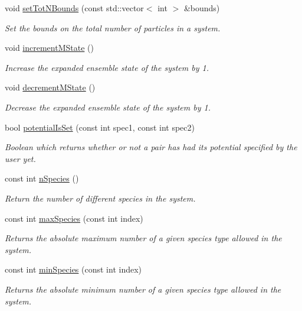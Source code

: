 \begin{DoxyCompactItemize}
void \hyperlink{classsim_system_a76b5dc3e179e275e40726c660d8e669b}{set\-Tot\-N\-Bounds} (const std\-::vector$<$ int $>$ \&bounds)
\begin{DoxyCompactList}\small\item\em Set the bounds on the total number of particles in a system. \end{DoxyCompactList}\item 
void \hyperlink{classsim_system_a5d61d583a40931ce5643bd6429f510ba}{increment\-M\-State} ()
\begin{DoxyCompactList}\small\item\em Increase the expanded ensemble state of the system by 1. \end{DoxyCompactList}\item 
void \hyperlink{classsim_system_a18e515d42d1d653bcac67d61701983eb}{decrement\-M\-State} ()
\begin{DoxyCompactList}\small\item\em Decrease the expanded ensemble state of the system by 1. \end{DoxyCompactList}\item 
bool \hyperlink{classsim_system_a40af191fae6091e26413ee06ae188ae9}{potential\-Is\-Set} (const int spec1, const int spec2)
\begin{DoxyCompactList}\small\item\em Boolean which returns whether or not a pair has had its potential specified by the user yet. \end{DoxyCompactList}\item 
const int \hyperlink{classsim_system_ab5e2e9b6204de15520302fe1d51688dd}{n\-Species} ()
\begin{DoxyCompactList}\small\item\em Return the number of different species in the system. \end{DoxyCompactList}\item 
const int \hyperlink{classsim_system_a93259b517f449f1ac610d132ac66b551}{max\-Species} (const int index)
\begin{DoxyCompactList}\small\item\em Returns the absolute maximum number of a given species type allowed in the system. \end{DoxyCompactList}\item 
const int \hyperlink{classsim_system_afafda4a09ed180ee9c5580d196d8ca9f}{min\-Species} (const int index)
\begin{DoxyCompactList}\small\item\em Returns the absolute minimum number of a given species type allowed in the system. \end{DoxyCompactList}\item 

\end{DoxyCompactItemize}
